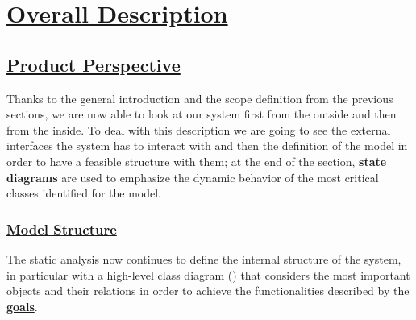 \section[Overall Description]{\hyperlink{toc}{Overall Description}}
\label{sec:overallDescription}
\subsection[Product Perspective]{\hyperlink{toc}{Product Perspective}}
	Thanks to the general introduction and the scope definition from the previous sections, we are now able to look at our system first from the outside and then from the inside. To deal with this description we are going to see the external interfaces the system has to interact with and then the definition of the model in order to have a feasible structure with them; at the end of the section, \textbf{state diagrams} are used to emphasize the dynamic behavior of the most critical classes identified for the model.
	
	\subsubsection[Model Structure]{\hyperlink{toc}{Model Structure}}
	The static analysis now continues to define the internal structure of the system, in particular with a high-level class diagram () that considers the most important objects and their relations in order to achieve the functionalities described by the \hyperref[sec:goals]{\textbf{goals}}.\\
	
